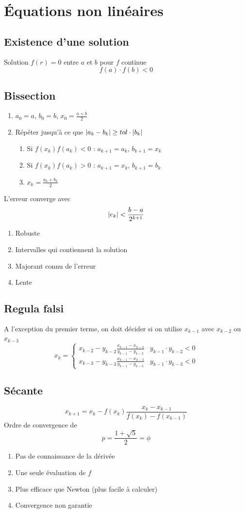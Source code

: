 \documentclass[resume]{subfiles}
\begin{document}
    \section{Équations non linéaires}
	\subsection{Existence d'une solution}
	Solution $f(r)=0$ entre $a$ et $b$ pour $f$ continue
	$$f(a)\cdot f(b)<0$$
	\subsection{Bissection}
	\begin{enumerate}
	\item $a_0=a$, $b_0=b$, $x_0=\frac{a+b}{2}$
	\item Répéter jusqu'à ce que $\abs{a_k-b_k}\geq tol\cdot \abs{b_k}$
	\begin{enumerate}
	\item Si $f(x_k)f(a_k)<0$ : $a_{k+1}=a_k$, $b_{k+1}=x_k$
	\item Si $f(x_k)f(a_k)>0$ : $a_{k+1}=x_k$, $b_{k+1}=b_k$
	\item $x_{k}=\frac{a_{k}+b_{k}}{2}$
	\end{enumerate}
	\end{enumerate}
	L'erreur converge avec
	$$\abs{e_k}<\frac{b-a}{2^{k+1}}$$
	\begin{enumerate}
	\item Robuste
	\item Intervalles qui contiennent la solution
	\item Majorant connu de l'erreur
	\item Lente
	\end{enumerate}
	\subsection{Regula falsi}
A l'exception du premier terme, on doit décider si on utilise $x_{k-1}$ avec $x_{k-2}$ ou $x_{k-3}$
$$\boxed{x_{k}=\begin{cases}
x_{k-2}-y_{k-2}\frac{x_{k-1}-x_{k-2}}{y_{k-1}-y_{k-2}} & y_{k-1}\cdot y_{k-2} < 0\\
x_{k-3}-y_{k-3}\frac{x_{k-1}-x_{k-3}}{y_{k-1}-y_{k-3}} & y_{k-1}\cdot y_{k-3} < 0
\end{cases}}$$
\subsection{Sécante}
$$\boxed{x_{k+1}=x_{k}-f(x_k)\frac{x_k-x_{k-1}}{f(x_k)-f(x_{k-1})}}$$
Ordre de convergence de
$$p=\frac{1+\sqrt{5}}{2}=\phi$$
\begin{enumerate}
\item Pas de connaissance de la dérivée
\item Une seule évaluation de $f$
\item Plus efficace que Newton (plus facile à calculer)
\item Convergence non garantie
\end{enumerate}
\end{document}
